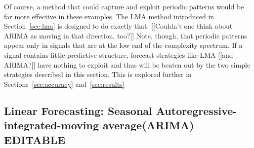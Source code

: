 Of course, a method that could capture and exploit periodic patterns
would be far more effective in these examples.  The LMA method
introduced in Section~\ref{sec:lma} is designed to do exactly that.
[[Couldn't one think about ARIMA as moving in that direction, too?]]
Note, though, that periodic patterns appear only in signals that are
at the low end of the complexity spectrum.  If a signal contains
little predictive structure, forecast strategies like LMA [[and
    ARIMA?]] have nothing to exploit and thus will be beaten out by
the two simple strategies described in this section.  This is explored
further in Sections~\ref{sec:accuracy} and~\ref{sec:results}


\subsection{Linear Forecasting: Seasonal Autoregressive-integrated-moving average(ARIMA){\color{blue} EDITABLE}}\label{sec:arima}




